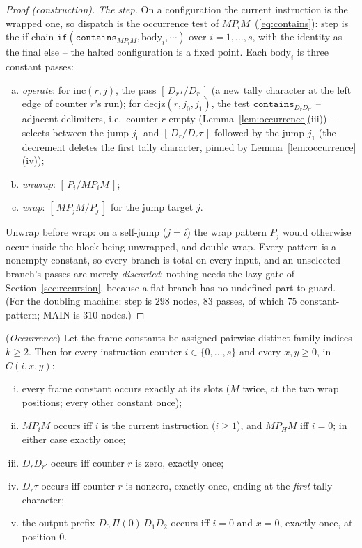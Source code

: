 \documentclass[runningheads,envcountsect]{llncs}
\begin{document}
\begin{proof}[Proof (construction)]
    \emph{The step.} On a configuration the current instruction is the
    wrapped one, so dispatch is the occurrence test of
    $M P_i M$~(\ref{eq:contains}): $\mathrm{step}$ is the if-chain
    $\mathtt{if}(\mathtt{contains}_{M P_i M}, \mathrm{body}_i,
    \cdots)$ over $i = 1, \dots, s$, with the identity as the final
    else -- the halted configuration is a fixed point. Each
    $\mathrm{body}_i$ is three constant passes:
    \begin{enumerate}[(a)]
        \item \emph{operate}: for $\mathrm{inc}(r, j)$, the pass
        $[\,D_r\tau/D_r\,]$ (a new tally character at the left edge of
        counter $r$'s run); for $\mathrm{decjz}(r, j_0, j_1)$, the test
        $\mathtt{contains}_{D_r D_{r'}}$ -- adjacent delimiters, i.e.\
        counter $r$ empty (Lemma~\ref{lem:occurrence}(iii)) -- selects
        between the jump $j_0$ and $[\,D_r/D_r\tau\,]$ followed by the
        jump $j_1$ (the decrement deletes the first tally character,
        pinned by Lemma~\ref{lem:occurrence}(iv));
        \item \emph{unwrap}: $[\,P_i/M P_i M\,]$;
        \item \emph{wrap}: $[\,M P_j M/P_j\,]$ for the jump target $j$.
    \end{enumerate}
    Unwrap before wrap: on a self-jump ($j = i$) the wrap pattern
    $P_j$ would otherwise occur inside the block being unwrapped, and
    double-wrap. Every pattern is a nonempty constant, so every branch
    is total on every input, and an unselected branch's passes are
    merely \emph{discarded}: nothing needs the lazy gate of
    Section~\ref{sec:recursion}, because a flat branch has no
    undefined part to guard. (For the doubling machine:
    $\mathrm{step}$ is $298$ nodes, $83$ passes, of which $75$
    constant-pattern; $\mathrm{MAIN}$ is $310$ nodes.)
\end{proof}

\begin{lemma}
    (\emph{Occurrence})
    \label{lem:occurrence}
    Let the frame constants be assigned pairwise distinct family
    indices $k \geq 2$. Then for every instruction counter
    $i \in \{0, \dots, s\}$ and every $x, y \geq 0$, in $C(i, x, y)$:
    \begin{enumerate}[(i)]
        \item every frame constant occurs exactly at its slots ($M$
        twice, at the two wrap positions; every other constant once);
        \item $M P_i M$ occurs iff $i$ is the current instruction
        ($i \geq 1$), and $M P_H M$ iff $i = 0$; in either case exactly
        once;
        \item $D_r D_{r'}$ occurs iff counter $r$ is zero, exactly once;
        \item $D_r\tau$ occurs iff counter $r$ is nonzero, exactly
        once, ending at the \emph{first} tally character;
        \item the output prefix $D_0\,\Pi(0)\,D_1 D_2$ occurs iff
        $i = 0$ and $x = 0$, exactly once, at position $0$.
    \end{enumerate}
\end{lemma}
\end{document}
